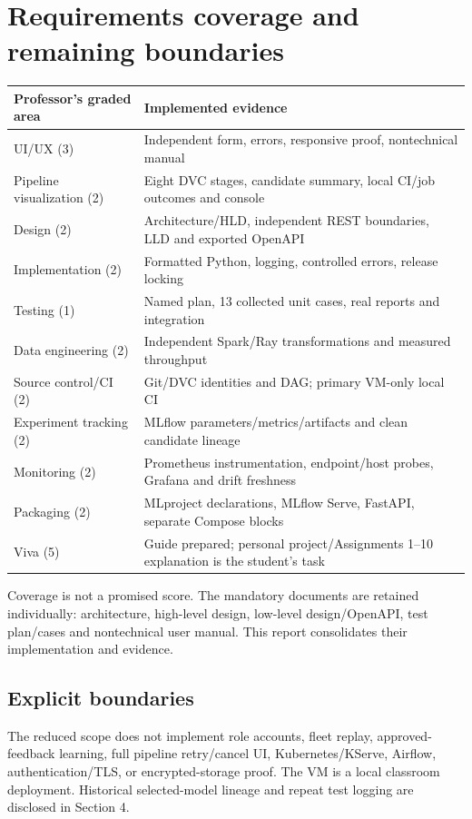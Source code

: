 \documentclass[11pt,a4paper]{article}
\begin{document}
\section{Requirements coverage and remaining boundaries}
\par
\begin{tabularx}{\linewidth}{@{}>{\raggedright\arraybackslash}p{40mm}Y@{}}\toprule
Professor's graded area & Implemented evidence \\\midrule
UI/UX (3) & Independent form, errors, responsive proof, nontechnical manual \\
Pipeline visualization (2) & Eight DVC stages, candidate summary, local CI/job outcomes and console \\
Design (2) & Architecture/HLD, independent REST boundaries, LLD and exported OpenAPI \\
Implementation (2) & Formatted Python, logging, controlled errors, release locking \\
Testing (1) & Named plan, 13 collected unit cases, real reports and integration \\
Data engineering (2) & Independent Spark/Ray transformations and measured throughput \\
Source control/CI (2) & Git/DVC identities and DAG; primary VM-only local CI \\
Experiment tracking (2) & MLflow parameters/metrics/artifacts and clean candidate lineage \\
Monitoring (2) & Prometheus instrumentation, endpoint/host probes, Grafana and drift freshness \\
Packaging (2) & MLproject declarations, MLflow Serve, FastAPI, separate Compose blocks \\
Viva (5) & Guide prepared; personal project/Assignments 1--10 explanation is the student's task \\\bottomrule
\end{tabularx}
\par
Coverage is not a promised score. The mandatory documents are retained individually: architecture, high-level design, low-level design/OpenAPI, test plan/cases and nontechnical user manual. This report consolidates their implementation and evidence.
\subsection{Explicit boundaries}
The reduced scope does not implement role accounts, fleet replay, approved-feedback learning, full pipeline retry/cancel UI, Kubernetes/KServe, Airflow, authentication/TLS, or encrypted-storage proof. The VM is a local classroom deployment. Historical selected-model lineage and repeat test logging are disclosed in Section 4.
\end{document}
